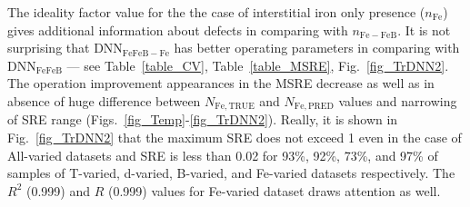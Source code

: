 \documentclass[a4paper,fleqn]{cas-sc}
\begin{document}
The ideality factor value for the the case of interstitial iron only presence ($n_\mathrm{Fe}$)
gives additional information about defects in comparing with $n_\mathrm{Fe-FeB}$.
It is not surprising that DNN$_\mathrm{FeFeB-Fe}$ has better operating parameters in comparing with
DNN$_\mathrm{FeFeB}$ --- see Table~\ref{table_CV}, Table~\ref{table_MSRE}, Fig.~\ref{fig_TrDNN2}.
The operation improvement appearances in the MSRE decrease as well as in
absence of huge difference between $N_\mathrm{Fe,TRUE}$ and $N_\mathrm{Fe,PRED}$ values
and narrowing of SRE range (Figs.~\ref{fig_Temp}-\ref{fig_TrDNN2}).
Really, it is shown in Fig.~\ref{fig_TrDNN2} that the maximum SRE does not exceed 1 even in the case of All-varied datasets
and SRE is less than 0.02 for 93\%, 92\%, 73\%, and 97\% of samples of T-varied, d-varied, B-varied, and Fe-varied datasets respectively.
The $R^2$ (0.999) and $R$ (0.999) values for Fe-varied dataset draws attention as well.
\end{document}
